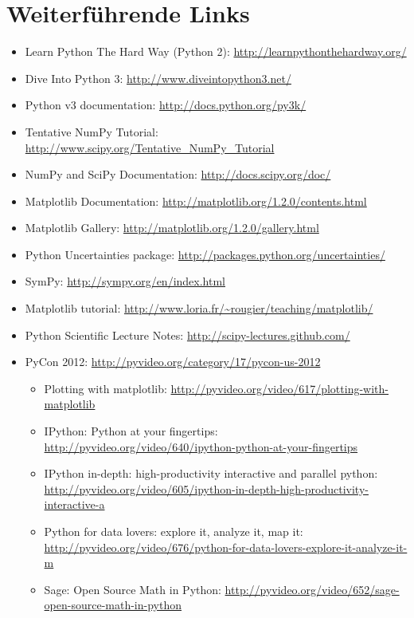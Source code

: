 \section{Weiterführende Links}
\begin{itemize}
  \item Learn Python The Hard Way (Python 2): \url{http://learnpythonthehardway.org/}
  \item Dive Into Python 3: \url{http://www.diveintopython3.net/}
  \item Python v3 documentation: \url{http://docs.python.org/py3k/}
  \item Tentative NumPy Tutorial: \url{http://www.scipy.org/Tentative\_NumPy\_Tutorial}
  \item NumPy and SciPy Documentation: \url{http://docs.scipy.org/doc/}
  \item Matplotlib Documentation: \url{http://matplotlib.org/1.2.0/contents.html}
  \item Matplotlib Gallery: \url{http://matplotlib.org/1.2.0/gallery.html}
  \item Python Uncertainties package: \url{http://packages.python.org/uncertainties/}
  \item SymPy: \url{http://sympy.org/en/index.html}
  \item Matplotlib tutorial: \url{http://www.loria.fr/~rougier/teaching/matplotlib/}
  \item Python Scientific Lecture Notes: \url{http://scipy-lectures.github.com/}
  \item PyCon 2012: \url{http://pyvideo.org/category/17/pycon-us-2012}
    \begin{itemize}
      \item Plotting with matplotlib: \url{http://pyvideo.org/video/617/plotting-with-matplotlib}
      \item IPython: Python at your fingertips: \url{http://pyvideo.org/video/640/ipython-python-at-your-fingertips}
      \item IPython in-depth: high-productivity interactive and parallel python: \url{http://pyvideo.org/video/605/ipython-in-depth-high-productivity-interactive-a}
      \item Python for data lovers: explore it, analyze it, map it: \url{http://pyvideo.org/video/676/python-for-data-lovers-explore-it-analyze-it-m}
      \item Sage: Open Source Math in Python: \url{http://pyvideo.org/video/652/sage-open-source-math-in-python}
    \end{itemize}

\end{itemize}
